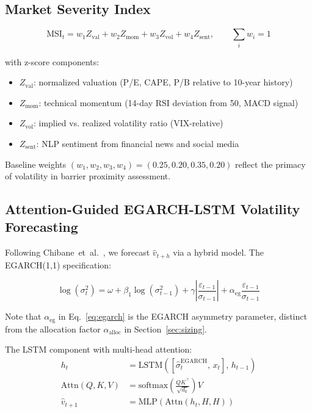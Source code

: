 \documentclass[12pt]{article}
\begin{document}
\subsection{Market Severity Index}

\begin{equation}
    \text{MSI}_t = w_1 Z_{\text{val}} + w_2 Z_{\text{mom}} + w_3 Z_{\text{vol}} + w_4 Z_{\text{sent}},
    \qquad \sum_i w_i = 1
\end{equation}

with z-score components:
\begin{itemize}[nosep]
    \item $Z_{\text{val}}$: normalized valuation (P/E, CAPE, P/B relative to 10-year history)
    \item $Z_{\text{mom}}$: technical momentum (14-day RSI deviation from 50, MACD signal)
    \item $Z_{\text{vol}}$: implied vs. realized volatility ratio (VIX-relative)
    \item $Z_{\text{sent}}$: NLP sentiment from financial news and social media
\end{itemize}

Baseline weights $(w_1, w_2, w_3, w_4) = (0.25, 0.20, 0.35, 0.20)$ reflect the primacy of
volatility in barrier proximity assessment.

\subsection{Attention-Guided EGARCH-LSTM Volatility Forecasting}

Following Chibane~et~al.~\cite{chibane2025attention}, we forecast $\hat{v}_{t+h}$ via a
hybrid model. The EGARCH(1,1) specification:

\begin{equation}
    \log(\sigma_t^2) = \omega + \beta_1 \log(\sigma_{t-1}^2)
    + \gamma \left|\frac{\varepsilon_{t-1}}{\sigma_{t-1}}\right|
    + \alpha_{\text{eg}} \frac{\varepsilon_{t-1}}{\sigma_{t-1}}
    \label{eq:egarch}
\end{equation}

Note that $\alpha_{\text{eg}}$ in Eq.~\eqref{eq:egarch} is the EGARCH asymmetry parameter,
distinct from the allocation factor $\alpha_{\text{alloc}}$ in Section~\ref{sec:sizing}.

The LSTM component with multi-head attention:
\begin{align}
    h_t &= \text{LSTM}([\hat{\sigma}_t^{\text{EGARCH}},\, x_t],\, h_{t-1}) \\
    \text{Attn}(Q, K, V) &= \text{softmax}\!\left(\frac{QK^\top}{\sqrt{d_k}}\right) V \\
    \hat{v}_{t+1} &= \text{MLP}(\text{Attn}(h_t, H, H))
\end{align}
\end{document}
